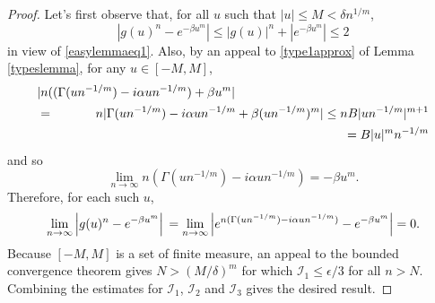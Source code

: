 \documentclass{article}
\theoremstyle{theorem}
\theoremstyle{remark}
\begin{document}
\begin{proof}
Let's first observe that, for all $u$ such that $|u|\leq M<\delta n^{1/m}$,
\begin{equation*}
|g(u)^n-e^{-\beta u^m}|\leq |g(u)|^n+|e^{-\beta u^m}|\leq 2
\end{equation*}
in view of \eqref{easylemmaeq1}. Also, by an appeal to \eqref{type1approx} of Lemma \ref{typeslemma}, for any $u\in[-M,M]$,
\begin{eqnarray*}
\lefteqn{|n((\Gamma (un^{-1/m})-i\alpha un^{-1/m})+\beta u^m|}\\
&=& n|\Gamma(un^{-1/m})-i\alpha un^{-1/m}+\beta (un^{-1/m})^m|\leq nB|un^{-1/m}|^{m+1}\\
&&\hspace{8cm}=B|u|^mn^{-1/m}
\end{eqnarray*}
and so 
\begin{equation*}
\lim_{n\rightarrow\infty}n(\Gamma (un^{-1/m})-i\alpha un^{-1/m})=-\beta u^m. 
\end{equation*}
 Therefore, for each such $u$,
\begin{equation*}
\lim_{n\rightarrow\infty}\left|g(u)^n-e^{-\beta u^m}\right|\\
=\lim_{n\rightarrow\infty}\left|e^{n(\Gamma(un^{-1/m})-i\alpha un^{-1/m})}-e^{-\beta u^m}\right|=0.
\end{equation*}
Because $[-M,M]$ is a set of finite measure, an appeal to the bounded convergence theorem gives $N>(M/\delta)^m$ for which $\mathcal{I}_1\leq \epsilon/3$ for all $n>N$. Combining
the estimates for $\mathcal{I}_1$, $\mathcal{I}_2$ and $\mathcal{I}_3$ gives the desired result. 
\end{proof}
\end{document}
